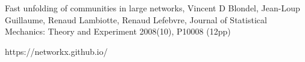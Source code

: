 \documentclass[letterpaper, 11pt]{article}
\begin{document}
\newpage
\begin{thebibliography}{9}

Fast unfolding of communities in large networks, Vincent D Blondel, Jean-Loup Guillaume, Renaud Lambiotte, Renaud Lefebvre, Journal of Statistical Mechanics: Theory and Experiment 2008(10), P10008 (12pp)

https://networkx.github.io/

\end{thebibliography}
\end{document}
